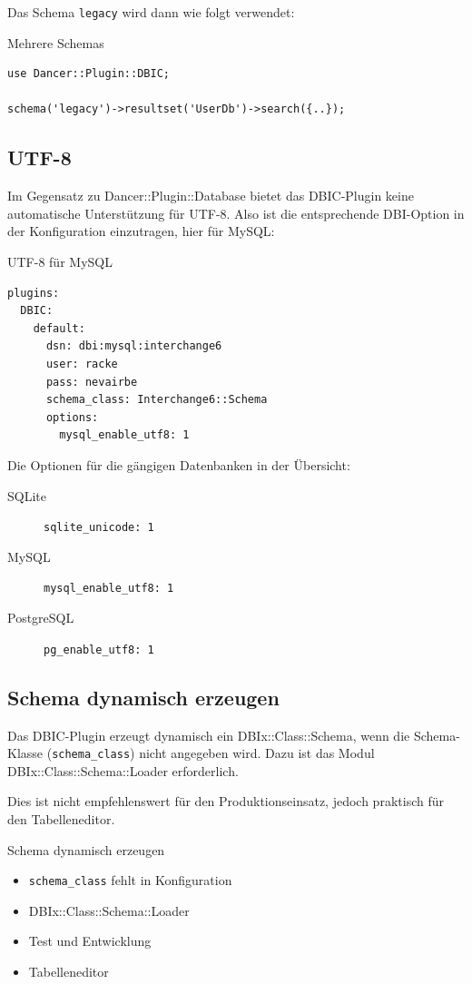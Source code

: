 Das Schema \verb|legacy| wird dann wie folgt verwendet:

\begin{frame}[fragile]{Mehrere Schemas}
\begin{lstlisting}
use Dancer::Plugin::DBIC;

schema('legacy')->resultset('UserDb')->search({..});
\end{lstlisting}
\end{frame}

\subsection{UTF-8}
Im Gegensatz zu Dancer::Plugin::Database bietet das DBIC-Plugin
keine automatische Unterstützung für UTF-8. Also ist die entsprechende
DBI-Option in der Konfiguration einzutragen, hier für MySQL:
\begin{frame}[fragile]{UTF-8 für MySQL}
\begin{lstlisting}
plugins:
  DBIC:
    default:
      dsn: dbi:mysql:interchange6
      user: racke
      pass: nevairbe
      schema_class: Interchange6::Schema
      options:
        mysql_enable_utf8: 1
\end{lstlisting}
\end{frame}

Die Optionen für die gängigen Datenbanken in der Übersicht:

\begin{description}
\item[SQLite] \verb|sqlite_unicode: 1|
\item[MySQL] \verb|mysql_enable_utf8: 1|
\item[PostgreSQL] \verb|pg_enable_utf8: 1| 
\end{description}

\subsection{Schema dynamisch erzeugen}
Das DBIC-Plugin erzeugt dynamisch ein DBIx::Class::Schema, wenn
die Schema-Klasse (\verb|schema_class|) nicht angegeben wird.
Dazu ist das Modul DBIx::Class::Schema::Loader erforderlich.

Dies ist nicht empfehlenswert für den Produktionseinsatz, jedoch
praktisch für den Tabelleneditor.

\begin{frame}[fragile]{Schema dynamisch erzeugen}
\begin{itemize}
\item \verb|schema_class| fehlt in Konfiguration
\item DBIx::Class::Schema::Loader
\item Test und Entwicklung
\item Tabelleneditor
\end{itemize}
\end{frame}

